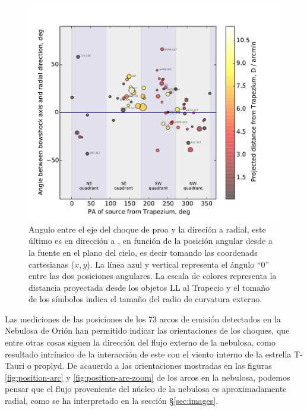 \begin{figure}
  \centering
  \includegraphics[width=\linewidth, clip]{luis-programas/will-PA-vs-PA}
  \caption{Angulo entre el eje del choque de proa y la direción a radial, este último es en dirección a \thC{}, en función de la posición angular desde \thC{} a la fuente en el plano del cielo, es decir tomando las coordenads cartesianas (\(x, y\)). La línea azul y vertical representa el ángulo ``0'' entre las dos posiciones angulares. La escala de colores representa la distancia proyectada desde los objetos LL al Trapecio y el tomaño de los símbolos indica el tamaño del radio de curvatura externo.}
 \label{fig:pos-angular}
\end{figure}

Las mediciones de las posiciones de los 73 arcos de emisión detectados en la Nebulosa de Orión han permitido indicar las orientaciones de los choques, que entre otras cosas siguen la dirección del flujo externo de la nebulosa, como resultado intrínsico de la interacción de este con el viento interno de la estrella T-Tauri o proplyd. De acauerdo a las orientaciones mostradas en las  figuras \ref{fig:position-arc} y \ref{fig:position-arc-zoom} de los arcos en la nebulosa, podemos pensar que el flujo proveniente del núcleo de la nebulosa es aproximadamente radial, como se ha interpretado en la sección \S\ref{sec:images}.\\

